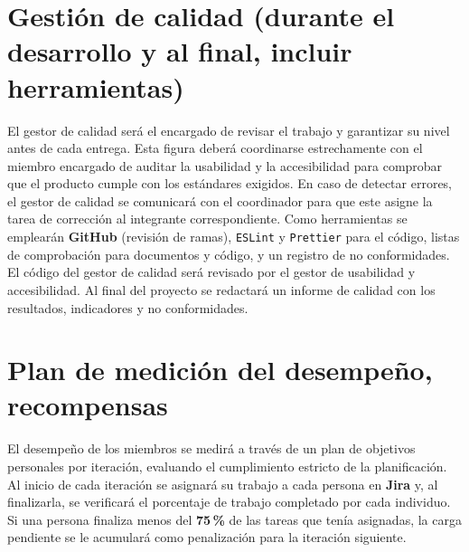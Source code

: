 \documentclass[11pt,a4paper]{article}
\newcommand{\key}[1]{\textbf{\color{brandblue}#1}}
\begin{document}
\begin{center}
\end{center}

\section{Gestión de calidad (durante el desarrollo y al final, incluir herramientas)}
El gestor de calidad será el encargado de revisar el trabajo y garantizar su nivel antes de cada entrega. Esta figura deberá coordinarse estrechamente con el miembro encargado de auditar la usabilidad y la accesibilidad para comprobar que el producto cumple con los estándares exigidos. En caso de detectar errores, el gestor de calidad se comunicará con el coordinador para que este asigne la tarea de corrección al integrante correspondiente. Como herramientas se emplearán \key{GitHub} (revisión de ramas), \texttt{ESLint} y \texttt{Prettier} para el código, listas de comprobación para documentos y código, y un registro de no conformidades. El código del gestor de calidad será revisado por el gestor de usabilidad y accesibilidad. Al final del proyecto se redactará un informe de calidad con los resultados, indicadores y no conformidades.

\section{Plan de medición del desempeño, recompensas}
El desempeño de los miembros se medirá a través de un plan de objetivos personales por iteración, evaluando el cumplimiento estricto de la planificación. Al inicio de cada iteración se asignará su trabajo a cada persona en \key{Jira} y, al finalizarla, se verificará el porcentaje de trabajo completado por cada individuo. Si una persona finaliza menos del \key{75\,\%} de las tareas que tenía asignadas, la carga pendiente se le acumulará como penalización para la iteración siguiente.
\end{document}
